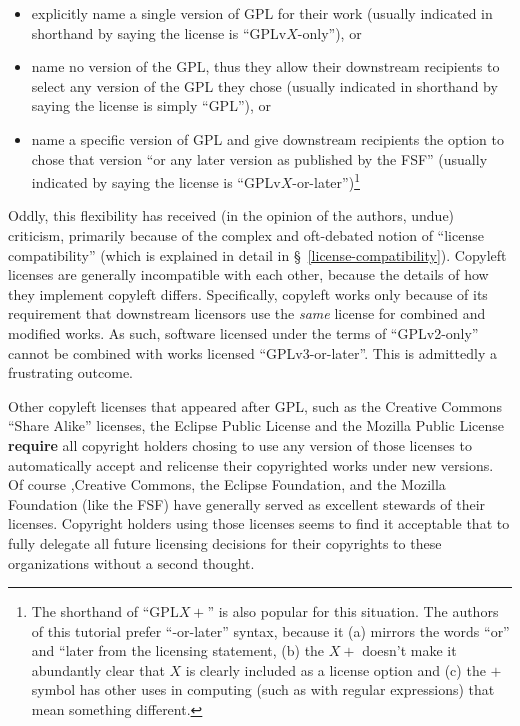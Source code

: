 \begin{itemize}

\item explicitly name a single version of GPL for their work (usually
  indicated in shorthand by saying the license is ``GPLv$X$-only''), or

\item name no version of the GPL, thus they allow their downstream recipients
  to select any version of the GPL they chose (usually indicated in shorthand
  by saying the license is simply ``GPL''), or

\item name a specific version of GPL and give downstream recipients the
  option to chose that version ``or any later version as published by the
  FSF'' (usually indicated by saying the license is
  ``GPLv$X$-or-later'')\footnote{The shorthand of ``GPL$X+$'' is also popular
    for this situation.  The authors of this tutorial prefer ``-or-later''
    syntax, because it (a) mirrors the words ``or'' and ``later from the
    licensing statement, (b) the $X+$ doesn't make it abundantly clear that
    $X$ is clearly included as a license option and (c) the $+$ symbol has
    other uses in computing (such as with regular expressions) that mean
    something different.}
\end{itemize}

\label{license-compatibility-first-mentioned}

Oddly, this flexibility has received (in the opinion of the authors, undue)
criticism, primarily because of the complex and oft-debated notion of
``license compatibility'' (which is explained in detail in
\S~\ref{license-compatibility}).  Copyleft licenses are generally
incompatible with each other, because the details of how they implement
copyleft differs.  Specifically, copyleft works only because of its
requirement that downstream licensors use the \textit{same} license for
combined and modified works.  As such, software licensed under the terms of
``GPLv2-only'' cannot be combined with works licensed ``GPLv3-or-later''.
This is admittedly a frustrating outcome.

Other copyleft licenses that appeared after GPL, such
as the Creative Commons ``Share Alike'' licenses, the Eclipse Public License
and the Mozilla Public License \textbf{require} all copyright holders chosing
to use any version of those licenses to automatically accept and relicense
their copyrighted works under new versions.  Of course ,Creative Commons, the
Eclipse Foundation, and the Mozilla Foundation (like the FSF) have generally
served as excellent stewards of their licenses.  Copyright holders using
those licenses seems to find it acceptable that to fully delegate all future
licensing decisions for their copyrights to these organizations without a
second thought.

